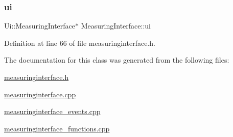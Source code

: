 \mbox{\label{classMeasuringInterface_a6f8e1020a154cb26eb10d3755130e22f}} 
\subsubsection{\texorpdfstring{ui}{ui}}
{\footnotesize\ttfamily Ui\+::\+Measuring\+Interface$\ast$ Measuring\+Interface\+::ui\hspace{0.3cm}{\ttfamily [private]}}



Definition at line 66 of file measuringinterface.\+h.



The documentation for this class was generated from the following files\+:\begin{DoxyCompactItemize}
\item 
\mbox{\hyperlink{measuringinterface_8h}{measuringinterface.\+h}}\item 
\mbox{\hyperlink{measuringinterface_8cpp}{measuringinterface.\+cpp}}\item 
\mbox{\hyperlink{measuringinterface__events_8cpp}{measuringinterface\+\_\+events.\+cpp}}\item 
\mbox{\hyperlink{measuringinterface__functions_8cpp}{measuringinterface\+\_\+functions.\+cpp}}\end{DoxyCompactItemize}

